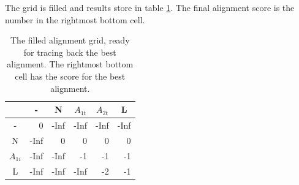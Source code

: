 The grid is filled and results store in table \ref{NW_full_table}.
The final alignment score is the number in the rightmost bottom cell.
\begin{table}[ht!]
\centering
\begin{tabular}{c|r|r|r|r|r|}
\rowcolor[HTML]{EFEFEF}
                                 & \multicolumn{1}{c|}{\cellcolor[HTML]{EFEFEF}-} & \multicolumn{1}{c|}{\cellcolor[HTML]{EFEFEF}N} & \multicolumn{1}{c|}{\cellcolor[HTML]{EFEFEF}$A_{1t}$} & \multicolumn{1}{c|}{\cellcolor[HTML]{EFEFEF}$A_{2t}$} & \multicolumn{1}{c|}{\cellcolor[HTML]{EFEFEF}L} \\ \hline
\cellcolor[HTML]{EFEFEF}-        & 0                                              & -Inf                                            & -Inf                                                   & -Inf                                                   & -Inf                                            \\ \hline
\cellcolor[HTML]{EFEFEF}N        & -Inf                                            & 0                                              & 0                                                   & 0                                                   & 0                                            \\ \hline
\cellcolor[HTML]{EFEFEF}$A_{1i}$ & -Inf                                            & -Inf                                            & -1                                                     & -1                                                   & -1                                            \\ \hline
\cellcolor[HTML]{EFEFEF}L        & -Inf                                            & -Inf                                            & -Inf                                                   & -2                                                    & -1                                            \\ \hline
\end{tabular}
    \caption{
         \label{NW_full_table}
             The filled alignment grid, ready for tracing back the best alignment. The rightmost bottom cell has the score for the best alignment.
             }
\end{table}

